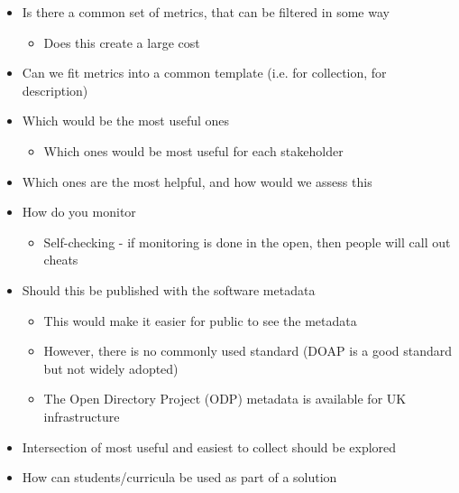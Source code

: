 \begin{itemize}

\item
Is there a common set of metrics, that can be filtered in some way

\begin{itemize}
\item
        Does this create a large cost
\end{itemize}

\item
Can we fit metrics into a common template (i.e. for collection, for description)

\item
Which would be the most useful ones

\begin{itemize}
\item
        Which ones would be most useful for each stakeholder
\end{itemize}

\item
Which ones are the most helpful, and how would we assess this

\item
How do you monitor

\begin{itemize}
\item
        Self-checking - if monitoring is done in the open, then people will call out cheats
\end{itemize}

\item
Should this be published with the software metadata

\begin{itemize}
\item
        This would make it easier for public to see the metadata

\item
        However, there is no commonly used standard (DOAP is a good standard but not widely adopted) 

\item
        The Open Directory Project (ODP) metadata is available for UK infrastructure
\end{itemize}

\item
Intersection of most useful and easiest to collect should be explored

\item
How can students/curricula be used as part of a solution


\end{itemize}
